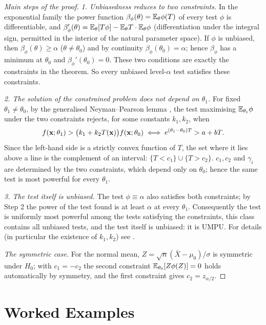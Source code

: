\documentclass[main.tex]{subfiles}
\begin{document}
\begin{proof}[Main steps of the proof]
\emph{1. Unbiasedness reduces to two constraints.} In the exponential family the power function $\beta_\phi(\theta)=\mathbb{E}_\theta\phi(T)$ of every test $\phi$ is differentiable, and $\beta_\phi'(\theta)=\mathbb{E}_\theta[T\phi]-\mathbb{E}_\theta T\cdot\mathbb{E}_\theta\phi$ (differentiation under the integral sign, permitted in the interior of the natural parameter space). If $\phi$ is unbiased, then $\beta_\phi(\theta)\ge\alpha$ ($\theta\ne\theta_0$) and by continuity $\beta_\phi(\theta_0)=\alpha$; hence $\beta_\phi$ has a minimum at $\theta_0$ and $\beta_\phi'(\theta_0)=0$. These two conditions are exactly the constraints in the theorem. So every unbiased level-$\alpha$ test satisfies these constraints.

\emph{2. The solution of the constrained problem does not depend on $\theta_1$.} For fixed $\theta_1\ne\theta_0$, by the generalised Neyman--Pearson lemma \cite[Theorem~3.6.1]{lehmann-romano}, the test maximising $\mathbb{E}_{\theta_1}\phi$ under the two constraints rejects, for some constants $k_1,k_2$, when
\[
f(\mathbf{x};\theta_1)>\big(k_1+k_2T(\mathbf{x})\big)f(\mathbf{x};\theta_0)\iff e^{(\theta_1-\theta_0)T}>a+bT .
\]
Since the left-hand side is a strictly convex function of $T$, the set where it lies above a line is the complement of an interval: $\{T<c_1\}\cup\{T>c_2\}$. $c_1,c_2$ and $\gamma_i$ are determined by the two constraints, which depend only on $\theta_0$; hence the same test is most powerful for every $\theta_1$.

\emph{3. The test itself is unbiased.} The test $\phi\equiv\alpha$ also satisfies both constraints; by Step 2 the power of the test found is at least $\alpha$ at every $\theta_1$. Consequently the test is uniformly most powerful among the tests satisfying the constraints, this class contains all unbiased tests, and the test itself is unbiased: it is UMPU. For details (in particular the existence of $k_1,k_2$) see \cite[Sections~4.2--4.4]{lehmann-romano}.

\emph{The symmetric case.} For the normal mean, $Z=\sqrt n(\bar X-\mu_0)/\sigma$ is symmetric under $H_0$; with $c_1=-c_2$ the second constraint $\mathbb{E}_{\theta_0}[Z\phi(Z)]=0$ holds automatically by symmetry, and the first constraint gives $c_2=z_{\alpha/2}$.
\end{proof}

\section{Worked Examples}
\end{document}
